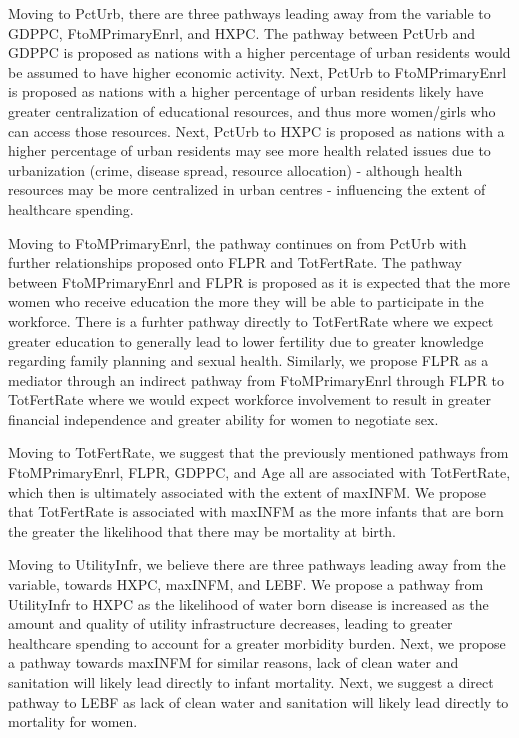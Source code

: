 \documentclass[
]{article}
\begin{document}
Moving to PctUrb, there are three pathways leading away from the
variable to GDPPC, FtoMPrimaryEnrl, and HXPC. The pathway between PctUrb
and GDPPC is proposed as nations with a higher percentage of urban
residents would be assumed to have higher economic activity. Next,
PctUrb to FtoMPrimaryEnrl is proposed as nations with a higher
percentage of urban residents likely have greater centralization of
educational resources, and thus more women/girls who can access those
resources. Next, PctUrb to HXPC is proposed as nations with a higher
percentage of urban residents may see more health related issues due to
urbanization (crime, disease spread, resource allocation) - although
health resources may be more centralized in urban centres - influencing
the extent of healthcare spending.

Moving to FtoMPrimaryEnrl, the pathway continues on from PctUrb with
further relationships proposed onto FLPR and TotFertRate. The pathway
between FtoMPrimaryEnrl and FLPR is proposed as it is expected that the
more women who receive education the more they will be able to
participate in the workforce. There is a furhter pathway directly to
TotFertRate where we expect greater education to generally lead to lower
fertility due to greater knowledge regarding family planning and sexual
health. Similarly, we propose FLPR as a mediator through an indirect
pathway from FtoMPrimaryEnrl through FLPR to TotFertRate where we would
expect workforce involvement to result in greater financial independence
and greater ability for women to negotiate sex.

Moving to TotFertRate, we suggest that the previously mentioned pathways
from FtoMPrimaryEnrl, FLPR, GDPPC, and Age all are associated with
TotFertRate, which then is ultimately associated with the extent of
maxINFM. We propose that TotFertRate is associated with maxINFM as the
more infants that are born the greater the likelihood that there may be
mortality at birth.

Moving to UtilityInfr, we believe there are three pathways leading away
from the variable, towards HXPC, maxINFM, and LEBF. We propose a pathway
from UtilityInfr to HXPC as the likelihood of water born disease is
increased as the amount and quality of utility infrastructure decreases,
leading to greater healthcare spending to account for a greater
morbidity burden. Next, we propose a pathway towards maxINFM for similar
reasons, lack of clean water and sanitation will likely lead directly to
infant mortality. Next, we suggest a direct pathway to LEBF as lack of
clean water and sanitation will likely lead directly to mortality for
women.
\end{document}
